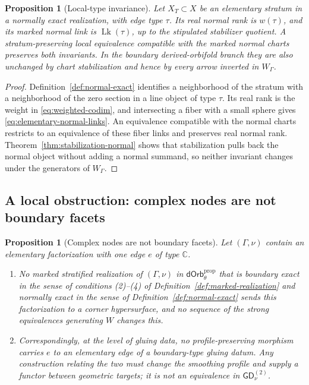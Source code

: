 \documentclass[11pt,letterpaper,twoside]{article}
\theoremstyle{plain}
\newtheorem{proposition}[theorem]{Proposition}
\theoremstyle{definition}
\theoremstyle{remark}
\newcommand{\LGrm}{\mathsf{GD}_{\nu}}
\newcommand{\dOrb}{\mathsf{dOrb}}
\begin{document}
\begin{proposition}[Local-type invariance]\label{prop:local-type-invariance}
Let \(X_T\subset X\) be an elementary stratum in a normally exact realization, with edge type \(\tau\).  Its real normal rank is \(w(\tau)\), and its marked normal link is \(\operatorname{Lk}(\tau)\), up to the stipulated stabilizer quotient.  A stratum-preserving local equivalence compatible with the marked normal charts preserves both invariants.  In the boundary derived-orbifold branch they are also unchanged by chart stabilization and hence by every arrow inverted in \(W_\Gamma\).
\end{proposition}

\begin{proof}
Definition~\ref{def:normal-exact} identifies a neighborhood of the stratum with a neighborhood of the zero section in a line object of type \(\tau\).  Its real rank is the weight in \eqref{eq:weighted-codim}, and intersecting a fiber with a small sphere gives \eqref{eq:elementary-normal-links}.  An equivalence compatible with the normal charts restricts to an equivalence of these fiber links and preserves real normal rank.  Theorem~\ref{thm:stabilization-normal} shows that stabilization pulls back the normal object without adding a normal summand, so neither invariant changes under the generators of \(W_\Gamma\).
\end{proof}

\subsection{A local obstruction: complex nodes are not boundary facets}

\begin{proposition}[Complex nodes are not boundary facets]\label{prop:complex-boundary}
Let \((\Gamma,\nu)\) contain an elementary factorization with one edge \(e\) of type \(\mathbb C\).
\begin{enumerate}
\item No marked stratified realization of \((\Gamma,\nu)\) in \(\dOrb_\theta^{\mathrm{prop}}\) that is boundary exact in the sense of conditions (2)--(4) of Definition~\ref{def:marked-realization} and normally exact in the sense of Definition~\ref{def:normal-exact} sends this factorization to a corner hypersurface, and no sequence of the strong equivalences generating \(W\) changes this.
\item Correspondingly, at the level of gluing data, no profile-preserving morphism carries \(e\) to an elementary edge of a boundary-type gluing datum.  Any construction relating the two must change the smoothing profile and supply a functor between geometric targets; it is not an equivalence in \(\LGrm^{(2)}\).
\end{enumerate}
\end{proposition}
\end{document}
